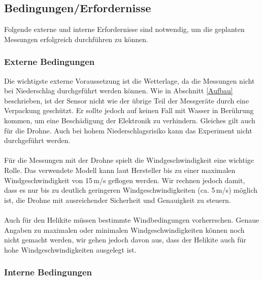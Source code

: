 \documentclass[a4paper,11pt,DIV=calc,tablecaptionabove,headinclude,twoside]{article}
\begin{document}
\subsection{Bedingungen/Erfordernisse}
\label{Bedingungen}

Folgende externe und interne Erfordernisse sind notwendig, um die geplanten Messungen erfolgreich durchführen zu können.

\subsubsection{Externe Bedingungen}

Die wichtigste externe Voraussetzung ist die Wetterlage, da die Messungen nicht bei Niederschlag durchgeführt werden können. Wie in Abschnitt \ref{Aufbau} beschrieben, ist der Sensor nicht wie der übrige Teil der Messgeräte durch eine Verpackung geschützt. Er sollte jedoch auf keinen Fall mit Wasser in Berührung kommen, um eine Beschädigung der Elektronik zu verhindern. Gleiches gilt auch für die Drohne. Auch bei hohem Niederschlagsrisiko kann das Experiment nicht durchgeführt werden. \\\\
Für die Messungen mit der Drohne spielt die Windgeschwindigkeit eine wichtige Rolle. Das verwendete Modell kann laut Hersteller bis zu einer maximalen Windgeschwindigkeit von 15\,m/s geflogen werden. Wir rechnen jedoch damit, dass es nur bis zu deutlich geringeren Windgeschwindigkeiten (ca. 5\,m/s) möglich ist, die Drohne mit ausreichender Sicherheit und Genauigkeit zu steuern. \\\\
Auch für den Helikite müssen bestimmte Windbedingungen vorherrschen. Genaue Angaben zu maximalen oder minimalen Windgeschwindigkeiten können noch nicht gemacht werden, wir gehen jedoch davon aus, dass der Helikite auch für hohe Windgeschwindigkeiten ausgelegt ist.

\subsubsection{Interne Bedingungen}
\end{document}
